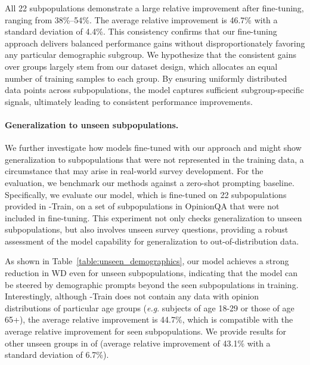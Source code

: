 All 22 subpopulations demonstrate a large relative improvement after fine-tuning, ranging from 38\%--54\%.
The average relative improvement is 46.7\% with a standard deviation of 4.4\%.
This consistency confirms that our fine-tuning approach delivers balanced performance gains without disproportionately favoring any particular demographic subgroup.
We hypothesize that the consistent gains over groups largely stem from our dataset design, 
which allocates an equal number of training samples to each group. 
By ensuring uniformly distributed data points across subpopulations, the model captures sufficient subgroup-specific signals, ultimately leading to consistent performance improvements.

\paragraph{Generalization to unseen subpopulations.}
We further investigate how models fine-tuned with our approach and \OURDATA might show generalization to subpopulations that were not represented in the training data, a circumstance that may arise in real-world survey development. 
For the evaluation, we benchmark our methods against a zero-shot prompting baseline. 
Specifically, we evaluate our model, which is fine-tuned on 22 subpopulations provided in \OURDATA-Train,
on a set of subpopulations in OpinionQA that were not included in fine-tuning. 
This experiment not only checks generalization to unseen subpopulations, but also involves unseen survey questions, providing a robust assessment of the model capability for generalization to out-of-distribution data.

As shown in Table~\ref{table:unseen_demographics},
our model achieves a strong reduction in WD even for unseen subpopulations,
indicating that the model can be steered by demographic prompts beyond the seen subpopulations in training.
Interestingly, although \OURDATA-Train does not contain any data with opinion distributions of particular age groups
(\textit{e.g}. subjects of age 18-29 or those of age 65+),
the average relative improvement is 44.7\%, which is compatible with the average relative improvement for seen subpopulations. We provide results for other unseen groups in  of  (average relative improvement of 43.1\% with a standard deviation of 6.7\%).



